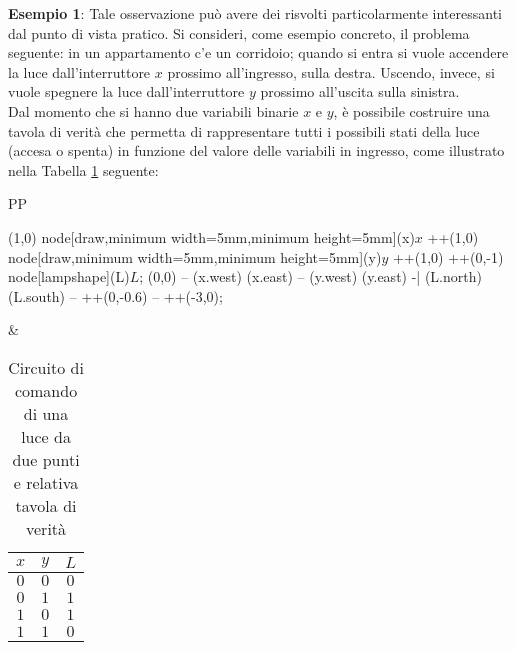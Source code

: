 \documentclass[a4paper]{extarticle}
\begin{document}
\vspace{1em}
\noindent
\textbf{Esempio 1}: Tale osservazione può avere dei risvolti particolarmente interessanti dal punto di vista pratico. Si consideri, come esempio concreto, il problema seguente: in un appartamento c’e un corridoio; quando si entra si vuole accendere la luce dall’interruttore \(x\) prossimo all’ingresso, sulla destra. Uscendo, invece, si vuole spegnere la luce dall’interruttore \(y\) prossimo all’uscita sulla sinistra.\\
Dal momento che si hanno due variabili binarie \(x\) e \(y\), è possibile costruire una tavola di verità che permetta di rappresentare tutti i possibili stati della luce (accesa o spenta) in funzione del valore delle variabili in ingresso, come illustrato nella Tabella \ref{tab:circuito_comando_luce_due_punti_e_tavola_verita} seguente:

\begin{table}[H]
    \centering
    \begin{tabularx}{\textwidth}{PP}
      {
          \begin{circuitikz}[]
            \draw (1,0) node[draw,minimum width=5mm,minimum height=5mm](x){$x$} ++(1,0) node[draw,minimum width=5mm,minimum height=5mm](y){$y$} ++(1,0) ++(0,-1) node[lampshape](L){\hspace{4em}$L$};
            \draw (0,0) -- (x.west) (x.east) -- (y.west) (y.east) -| (L.north) (L.south) -- ++(0,-0.6) -- ++(-3,0);
          \end{circuitikz}
      } & {
          \begin{tabular}{cc|c}
               \(x\) & \(y\) & \(L\)\\
               \hline
               \(0\) & \(0\) & \(0\)\\
               \(0\) & \(1\) & \(1\)\\
               \(1\) & \(0\) & \(1\)\\
               \(1\) & \(1\) & \(0\)\\
          \end{tabular}
      }
    \end{tabularx}
    \caption{Circuito di comando di una luce da due punti e relativa tavola di verità}
    \label{tab:circuito_comando_luce_due_punti_e_tavola_verita}
\end{table}
\end{document}
